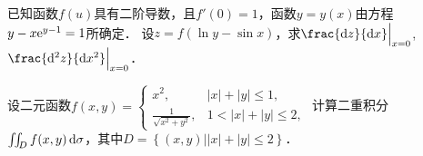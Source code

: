 \documentclass[plain,noanswer,medmath]{../../template/jnuexam}
\begin{document}
\begin{problem}[points=10]
已知函数$f(u)$具有二阶导数，且$f'(0) = 1$，函数$y = y(x)$由方程$y - x\mathrm{e}^{y - 1} = 1$所确定．
设$z = f(\ln y - \sin x)$，求$\frac{\dz}{\dx}\Big|_{x = 0}$, $\frac{\d^2z}{\dx^2}\Big|_{x = 0}$．
\end{problem}




\begin{problem}[points=11]
设二元函数$f(x,y) = \begin{cases}
  x^2, & |x| + |y| \le 1, \\
  \frac{1}{\sqrt{x^2 + y^2}}, & 1 < |x| + |y| \le 2,
\end{cases}$
计算二重积分$\iint_D f(x,y)\d\sigma$，其中$D = \left\{(x,y)\left| |x| + |y| \le 2 \right. \right\}$．
\end{problem}




\end{document}
